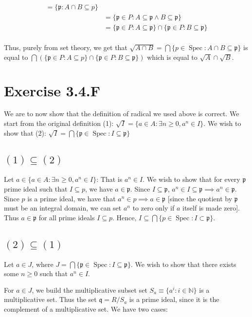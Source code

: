 \documentclass{book}
\newcommand{\N}{\ensuremath{\mathbb{N}}}
\newcommand{\Spec}{\operatorname{Spec}}
\newcommand{\p}{\mathfrak{p}}
\newcommand{\q}{\mathfrak{q}}
\newcommand{\rad}{\sqrt} %
\theoremstyle{definition}
\begin{document}
\begin{align*}
= \{ \p : A \cap B \subseteq p \} \\
&= \{ \p \in P: A \subseteq \p \land B \subseteq \p \} \\
&= \{ \p \in P: A \subseteq \p \} \cap \{ \p \in P: B \subseteq \p \} \\
\end{align*}

Thus, purely from set theory, we get that
$\rad{A \cap B} = \bigcap \{ p \in \Spec: A \cap B \subseteq \p \}$ is equal
to $\bigcap (\{ \p \in P: A \subseteq p \} \cap \{ \p \in P: B \subseteq \p \})$
which is equal to $\rad A \cap \rad B$.
                           
\section{Exercise 3.4.F}
We are to now show that the definition of radical we used above is correct.
We start from the original definition (1): $\sqrt I = \{ a \in A : \exists n \geq 0, a^n \in I\}$.
We wish to show that (2): $\sqrt I = \bigcap \{ \p \in \Spec: I \subseteq \p \}$

\subsection{$(1) \subseteq (2)$}
Let $a \in \{ a \in A : \exists n \geq 0, a^n \in I\}$:
That is $a^n \in I$. We wish to show that for every $\p$ prime
ideal such that $I \subseteq p$, we have $a \in \p$.
Since $I \subseteq \p$, $a^n \in I \subseteq \p \implies a^n \in \p$. 
Since $p$ is a prime ideal, we have that $a^n \in p \implies a \in \p$ [since the quotient by $\p$
must be an integral domain, we can set $a^n$ to zero only if $a$ itself is made zero].
Thus $a \in \p$ for all prime ideals $I \subseteq p$. Hence, 
$I \subseteq \bigcap \{ p \in \Spec: I \subset \p \}$. 


\subsection{$(2) \subseteq (1)$}
Let $a \in J$, where $J = \bigcap \{ \p \in \Spec: I \subseteq \p \}$. We wish to show that
there exists some $n \geq 0$ such that $a^n \in I$.


For $a \in J$, we build the multiplicative subset
set $S_a \equiv \{ a^i : i \in \N \}$ is a multiplicative set. Thus the set
$\q = R/S_a$ is a prime ideal, since it is the complement of a 
multiplicative set. We have two cases:
\end{document}
